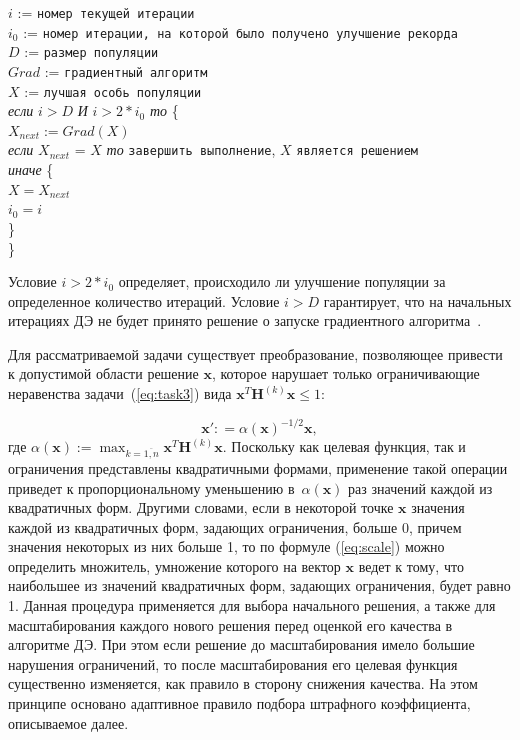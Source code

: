 \documentclass{llncs}
\begin{document}
\begin{flushleft}
\small
$i$ := \verb"номер текущей итерации" \\
$i_0$ := \verb"номер итерации, на которой было получено улучшение рекорда"\\
$D$ := \verb"размер популяции"\\
$Grad$ := \verb"градиентный алгоритм"\\
$X$ := \verb"лучшая особь популяции"\\

\textit{если} $i > D$ \textit{И} $i > 2 * i_0$ \textit{то} \{\\
\leftskip=12pt
    $X_{next} := Grad(X)$\\
    \textit{если} $X_{next}$ = $X$ \textit{то} \verb"завершить выполнение", $X$ \verb"является решением"\\
    \textit{иначе} \{\\
    \leftskip=24pt
        $X = X_{next}$\\
        $i_0 = i$\\
        \leftskip=12pt
    \}\\
    \leftskip=0pt
\}
\end{flushleft}
Условие $i > 2 * i_0$ определяет, происходило ли улучшение популяции за определенное количество итераций. Условие $i > D$ гарантирует, что на начальных итерациях ДЭ не будет принято решение о запуске градиентного алгоритма~\cite{eremeev:restart}.


Для рассматриваемой задачи существует преобразование, позволяющее привести к допустимой области решение $\textbf{x}$, которое нарушает только ограничивающие неравенства задачи~(\ref{eq:task3}) вида $\textbf{x}^{T}\textbf{H}^{(k)}\textbf{x} \leq 1$:

\begin{equation}
    \textbf{x}': =\alpha(\textbf{x})^{-1/2} \textbf{x} ,
    \label{eq:scale}
\end{equation}
где $\alpha(\textbf{x}):=\max_{k=\overline{1,n}} \textbf{x}^T \textbf{H}^{(k)}\textbf{x}$. Поскольку как целевая функция, так и ограничения представлены квадратичными формами, применение такой операции приведет к пропорциональному уменьшению в~$\alpha(\textbf{x})$ раз значений каждой из квадратичных форм. Другими словами, если в некоторой точке $\textbf{x}$ значения каждой из квадратичных форм, задающих ограничения, больше 0, причем значения некоторых из них больше 1, то по формуле (\ref{eq:scale}) можно определить множитель, умножение которого на вектор $\textbf{x}$ ведет к тому, что наибольшее из значений квадратичных форм, задающих ограничения, будет равно 1. Данная процедура применяется для выбора начального решения, а также для масштабирования каждого нового решения перед оценкой его качества в алгоритме ДЭ. При этом если решение до масштабирования имело большие нарушения ограничений, то после масштабирования его целевая функция существенно изменяется, как правило в сторону снижения качества. На этом принципе основано адаптивное правило подбора штрафного коэффициента, описываемое далее.
\end{document}
